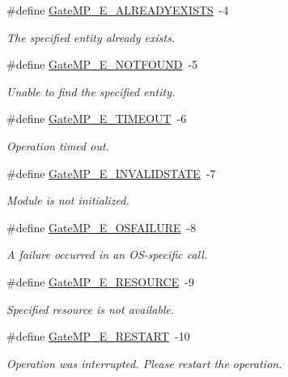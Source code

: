 \begin{DoxyCompactItemize}
\#define \hyperlink{_gate_m_p_8h_a20d3d7bbc6c7a5ef4372384072aad0b1}{GateMP\_\-E\_\-ALREADYEXISTS}~-\/4
\begin{DoxyCompactList}\small\item\em The specified entity already exists. \item\end{DoxyCompactList}\item 
\#define \hyperlink{_gate_m_p_8h_acdd82a5d634ec934ed7257eea8fb8d2c}{GateMP\_\-E\_\-NOTFOUND}~-\/5
\begin{DoxyCompactList}\small\item\em Unable to find the specified entity. \item\end{DoxyCompactList}\item 
\#define \hyperlink{_gate_m_p_8h_aaf80607f9e9ea4fba411e5693b0e8743}{GateMP\_\-E\_\-TIMEOUT}~-\/6
\begin{DoxyCompactList}\small\item\em Operation timed out. \item\end{DoxyCompactList}\item 
\#define \hyperlink{_gate_m_p_8h_a075d7c582f213e960e44c25ff138ad85}{GateMP\_\-E\_\-INVALIDSTATE}~-\/7
\begin{DoxyCompactList}\small\item\em Module is not initialized. \item\end{DoxyCompactList}\item 
\#define \hyperlink{_gate_m_p_8h_a2eac3b6964fe569e41231fb2fea8b18d}{GateMP\_\-E\_\-OSFAILURE}~-\/8
\begin{DoxyCompactList}\small\item\em A failure occurred in an OS-\/specific call. \item\end{DoxyCompactList}\item 
\#define \hyperlink{_gate_m_p_8h_ad07430b772c1d95c5ef2425b6c280fd9}{GateMP\_\-E\_\-RESOURCE}~-\/9
\begin{DoxyCompactList}\small\item\em Specified resource is not available. \item\end{DoxyCompactList}\item 
\#define \hyperlink{_gate_m_p_8h_a77205c8c44ab3edc4557cc4521cb3d04}{GateMP\_\-E\_\-RESTART}~-\/10
\begin{DoxyCompactList}\small\item\em Operation was interrupted. Please restart the operation. \item\end{DoxyCompactList}\end{DoxyCompactItemize}
